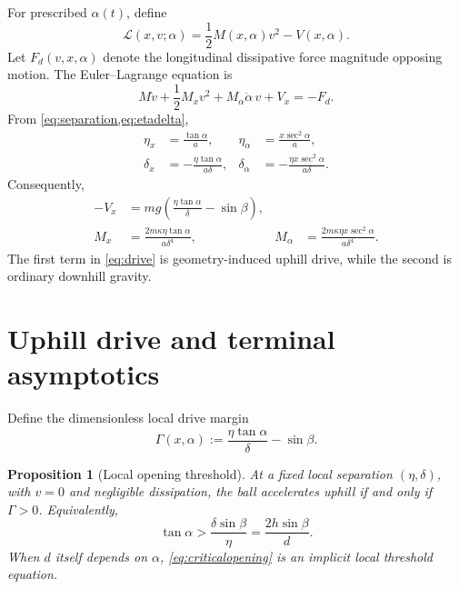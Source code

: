 \documentclass[11pt]{article}
\numberwithin{equation}{section}
\newtheorem{proposition}{Proposition}[section]
\theoremstyle{definition}
\theoremstyle{remark}
\begin{document}
For prescribed $\alpha(t)$, define
\begin{equation}
  \mathcal L(x,v;\alpha)=\frac12M(x,\alpha)v^2-V(x,\alpha).
  \label{eq:Lagrangian}
\end{equation}
Let $F_d(v,x,\alpha)$ denote the longitudinal dissipative force magnitude opposing motion.  The Euler--Lagrange equation is
\begin{equation}
  M\dot v+\frac12M_xv^2+M_\alpha\dot\alpha\,v+V_x=-F_d.
  \label{eq:reducedmotion}
\end{equation}
From \cref{eq:separation,eq:etadelta},
\begin{align}
  \eta_x&=\frac{\tan\alpha}{a},
  &\eta_\alpha&=\frac{x\sec^2\alpha}{a},\\
  \delta_x&=-\frac{\eta\tan\alpha}{a\delta},
  &\delta_\alpha&=-\frac{\eta x\sec^2\alpha}{a\delta}.
  \label{eq:deltaderivatives}
\end{align}
Consequently,
\begin{align}
  -V_x
   &=mg\left(\frac{\eta\tan\alpha}{\delta}-\sin\beta\right),
   \label{eq:drive}\\
  M_x
   &=\frac{2m\kappa\eta\tan\alpha}{a\delta^4},
  &M_\alpha
   &=\frac{2m\kappa\eta x\sec^2\alpha}{a\delta^4}.
  \label{eq:Mderivatives}
\end{align}
The first term in \cref{eq:drive} is geometry-induced uphill drive, while the second is ordinary downhill gravity.

\section{Uphill drive and terminal asymptotics}

Define the dimensionless local drive margin
\begin{equation}
  \Gamma(x,\alpha)
  :=\frac{\eta\tan\alpha}{\delta}-\sin\beta.
  \label{eq:Gamma}
\end{equation}

\begin{proposition}[Local opening threshold]
\label{prop:threshold}
At a fixed local separation $(\eta,\delta)$, with $v=0$ and negligible dissipation, the ball accelerates uphill if and only if $\Gamma>0$.  Equivalently,
\begin{equation}
  \tan\alpha>\frac{\delta\sin\beta}{\eta}
  =\frac{2h\sin\beta}{d}.
  \label{eq:criticalopening}
\end{equation}
When $d$ itself depends on $\alpha$, \cref{eq:criticalopening} is an implicit local threshold equation.
\end{proposition}
\end{document}
